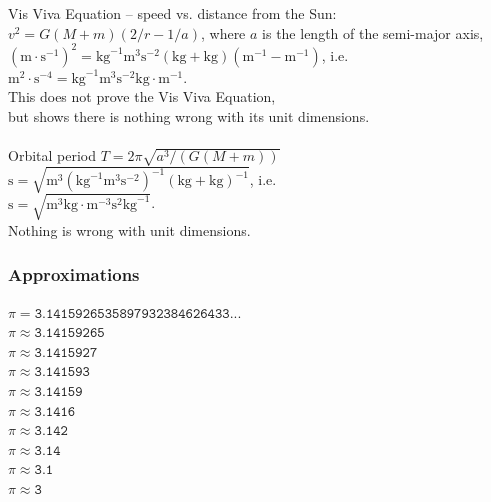 \documentclass[aspectratio=169,xcolor=pdftex,dvipsnames]{beamer} %
\begin{document}
\begin{frame}
Vis Viva Equation -- speed vs. distance from the Sun:\\ 
$v^2 = G(M+m)(2/r - 1/a)$, where $a$ is the length of the semi-major axis,
$(\text{m}\cdot\text{s}^{-1})^2 = \text{kg}^{-1}\text{m}^3\text{s}^{-2}(\text{kg}+\text{kg})(\text{m}^{-1} - \text{m}^{-1})$, i.e.\\
$\text{m}^2\cdot\text{s}^{-4} = \text{kg}^{-1}\text{m}^3\text{s}^{-2}\text{kg}\cdot\text{m}^{-1}$.\\
This does not prove the Vis Viva Equation,\\
but shows there is nothing wrong with its unit dimensions.
\\ \ \\
Orbital period $T = 2 \pi \sqrt{a^3 / (G(M+m))}$\\
$\text{s}=\sqrt{\text{m}^3 (\text{kg}^{-1}\text{m}^3\text{s}^{-2})^{-1}(\text{kg}+\text{kg})^{-1}}$, i.e.\\
$\text{s}=\sqrt{\text{m}^3 \text{kg}\cdot\text{m}^{-3}\text{s}^{2}\text{kg}^{-1}}$.\\
Nothing is wrong with unit dimensions.

\end{frame}


\begin{frame}
\frametitle{Approximations}

$\pi = \texttt{3.1415926535897932384626433...}$\\
$\pi \approx \texttt{3.14159265}$\\
$\pi \approx \texttt{3.1415927}$\\
$\pi \approx \texttt{3.141593}$\\
$\pi \approx \texttt{3.14159}$\\
$\pi \approx \texttt{3.1416}$\\
$\pi \approx \texttt{3.142}$\\
$\pi \approx \texttt{3.14}$\\
$\pi \approx \texttt{3.1}$\\
$\pi \approx \texttt{3}$\\

\end{frame}

\end{document}
